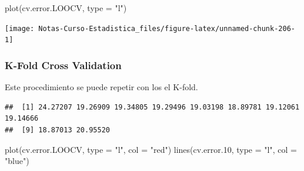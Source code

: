 \documentclass[
  12pt,
]{book}
\newenvironment{Shaded}{\begin{snugshade}}{\end{snugshade}}
\newcommand{\AttributeTok}[1]{\textcolor[rgb]{0.77,0.63,0.00}{#1}}
\newcommand{\ControlFlowTok}[1]{\textcolor[rgb]{0.13,0.29,0.53}{\textbf{#1}}}
\newcommand{\DecValTok}[1]{\textcolor[rgb]{0.00,0.00,0.81}{#1}}
\newcommand{\FloatTok}[1]{\textcolor[rgb]{0.00,0.00,0.81}{#1}}
\newcommand{\FunctionTok}[1]{\textcolor[rgb]{0.00,0.00,0.00}{#1}}
\newcommand{\NormalTok}[1]{#1}
\newcommand{\OtherTok}[1]{\textcolor[rgb]{0.56,0.35,0.01}{#1}}
\newcommand{\SpecialCharTok}[1]{\textcolor[rgb]{0.00,0.00,0.00}{#1}}
\newcommand{\StringTok}[1]{\textcolor[rgb]{0.31,0.60,0.02}{#1}}
\begin{document}
\begin{Shaded}
\begin{Highlighting}[]
\FunctionTok{plot}\NormalTok{(cv.error.LOOCV, }\AttributeTok{type =} \StringTok{"l"}\NormalTok{)}
\end{Highlighting}
\end{Shaded}

\begin{center}\texttt{[image: Notas-Curso-Estadistica\_files/figure-latex/unnamed-chunk-206-1]} \end{center}

\hypertarget{k-fold-cross-validation}{%
\subsubsection{K-Fold Cross Validation}\label{k-fold-cross-validation}}

Este procedimiento se puede repetir con los el K-fold.

\begin{Shaded}
\end{Shaded}

\begin{verbatim}
##  [1] 24.27207 19.26909 19.34805 19.29496 19.03198 18.89781 19.12061 19.14666
##  [9] 18.87013 20.95520
\end{verbatim}

\begin{Shaded}
\begin{Highlighting}[]
\FunctionTok{plot}\NormalTok{(cv.error.LOOCV, }\AttributeTok{type =} \StringTok{"l"}\NormalTok{, }\AttributeTok{col =} \StringTok{"red"}\NormalTok{)}
\FunctionTok{lines}\NormalTok{(cv.error}\FloatTok{.10}\NormalTok{, }\AttributeTok{type =} \StringTok{"l"}\NormalTok{, }\AttributeTok{col =} \StringTok{"blue"}\NormalTok{)}
\end{Highlighting}
\end{Shaded}
\end{document}
